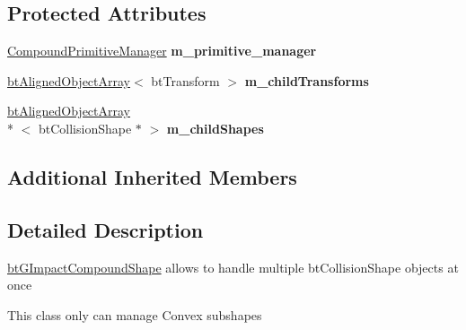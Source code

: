\subsection*{Protected Attributes}
\begin{DoxyCompactItemize}
\item 
\hypertarget{classbt_g_impact_compound_shape_ae4ad14e04e69e88634f9811973a39109}{\hyperlink{classbt_g_impact_compound_shape_1_1_compound_primitive_manager}{Compound\+Primitive\+Manager} {\bfseries m\+\_\+primitive\+\_\+manager}}\label{classbt_g_impact_compound_shape_ae4ad14e04e69e88634f9811973a39109}

\item 
\hypertarget{classbt_g_impact_compound_shape_a66956c32fbfe7f3c0964cbd0dfde566b}{\hyperlink{classbt_aligned_object_array}{bt\+Aligned\+Object\+Array}$<$ bt\+Transform $>$ {\bfseries m\+\_\+child\+Transforms}}\label{classbt_g_impact_compound_shape_a66956c32fbfe7f3c0964cbd0dfde566b}

\item 
\hypertarget{classbt_g_impact_compound_shape_aae79e1a4d800f58b2a3451e163b7adba}{\hyperlink{classbt_aligned_object_array}{bt\+Aligned\+Object\+Array}\\*
$<$ bt\+Collision\+Shape $\ast$ $>$ {\bfseries m\+\_\+child\+Shapes}}\label{classbt_g_impact_compound_shape_aae79e1a4d800f58b2a3451e163b7adba}

\end{DoxyCompactItemize}
\subsection*{Additional Inherited Members}


\subsection{Detailed Description}
\hyperlink{classbt_g_impact_compound_shape}{bt\+G\+Impact\+Compound\+Shape} allows to handle multiple bt\+Collision\+Shape objects at once 

This class only can manage Convex subshapes 

